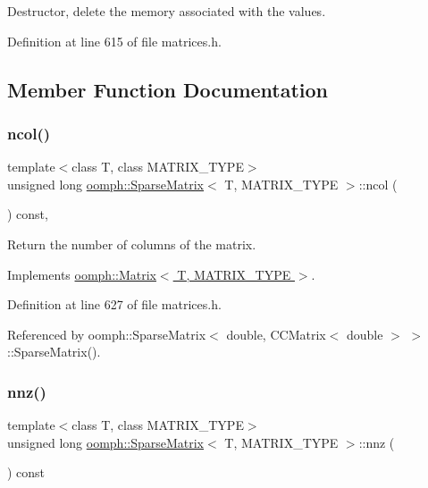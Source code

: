 Destructor, delete the memory associated with the values. 



Definition at line 615 of file matrices.\+h.



\subsection{Member Function Documentation}
\mbox{\label{classoomph_1_1SparseMatrix_a4db71b6d794cfcee1624c15c09d62d7f}} 
\subsubsection{\texorpdfstring{ncol()}{ncol()}}
{\footnotesize\ttfamily template$<$class T, class M\+A\+T\+R\+I\+X\+\_\+\+T\+Y\+PE$>$ \\
unsigned long \hyperlink{classoomph_1_1SparseMatrix}{oomph\+::\+Sparse\+Matrix}$<$ T, M\+A\+T\+R\+I\+X\+\_\+\+T\+Y\+PE $>$\+::ncol (\begin{DoxyParamCaption}{ }\end{DoxyParamCaption}) const\hspace{0.3cm}{\ttfamily [inline]}, {\ttfamily [virtual]}}



Return the number of columns of the matrix. 



Implements \hyperlink{classoomph_1_1Matrix_ad1af46b34096c348272b0dfacb5ce6a9}{oomph\+::\+Matrix$<$ T, M\+A\+T\+R\+I\+X\+\_\+\+T\+Y\+P\+E $>$}.



Definition at line 627 of file matrices.\+h.



Referenced by oomph\+::\+Sparse\+Matrix$<$ double, C\+C\+Matrix$<$ double $>$ $>$\+::\+Sparse\+Matrix().

\mbox{\label{classoomph_1_1SparseMatrix_a8b8010edcc0869283621e72a9bbc51e3}} 
\subsubsection{\texorpdfstring{nnz()}{nnz()}}
{\footnotesize\ttfamily template$<$class T, class M\+A\+T\+R\+I\+X\+\_\+\+T\+Y\+PE$>$ \\
unsigned long \hyperlink{classoomph_1_1SparseMatrix}{oomph\+::\+Sparse\+Matrix}$<$ T, M\+A\+T\+R\+I\+X\+\_\+\+T\+Y\+PE $>$\+::nnz (\begin{DoxyParamCaption}{ }\end{DoxyParamCaption}) const\hspace{0.3cm}{\ttfamily [inline]}}



